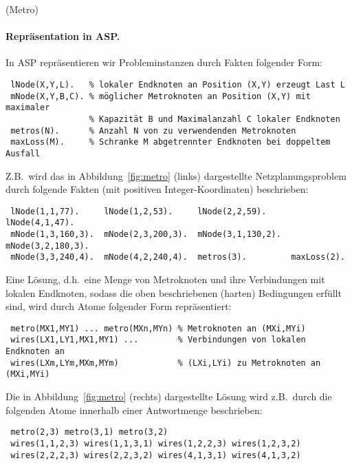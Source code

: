 \documentclass[a4paper,12pt,ngerman]{article}
\begin{document}
\begin{PraktikumsAufgabe}{2}{(Metro)}
\paragraph{Repräsentation in ASP.}

In ASP repräsentieren wir Probleminstanzen durch Fakten folgender Form:
\vspace{-1mm}
\begin{verbatim}
 lNode(X,Y,L).   % lokaler Endknoten an Position (X,Y) erzeugt Last L
 mNode(X,Y,B,C). % möglicher Metroknoten an Position (X,Y) mit maximaler
                 % Kapazität B und Maximalanzahl C lokaler Endknoten
 metros(N).      % Anzahl N von zu verwendenden Metroknoten
 maxLoss(M).     % Schranke M abgetrennter Endknoten bei doppeltem Ausfall
\end{verbatim}

\noindent
Z.B.\ wird das in Abbildung~\ref{fig:metro} (links) dargestellte Netzplanungsproblem
durch folgende Fakten (mit positiven Integer-Koordinaten) beschrieben:
\vspace{-1mm}
\begin{verbatim}
 lNode(1,1,77).     lNode(1,2,53).     lNode(2,2,59).     lNode(4,1,47).
 mNode(1,3,160,3).  mNode(2,3,200,3).  mNode(3,1,130,2).  mNode(3,2,180,3).
 mNode(3,3,240,4).  mNode(4,2,240,4).  metros(3).         maxLoss(2).
\end{verbatim}

\noindent
Eine Lösung, d.h.\ eine Menge von Metroknoten und ihre Verbindungen
mit lokalen Endknoten, sodass die oben beschriebenen (harten) Bedingungen erf\"ullt sind,
wird durch Atome folgender Form repräsentiert:%
\vspace{-1mm}
\begin{verbatim}
 metro(MX1,MY1) ... metro(MXn,MYn) % Metroknoten an (MXi,MYi)
 wires(LX1,LY1,MX1,MY1) ...        % Verbindungen von lokalen Endknoten an
 wires(LXm,LYm,MXm,MYm)            % (LXi,LYi) zu Metroknoten an (MXi,MYi)
\end{verbatim}
Die in Abbildung~\ref{fig:metro} (rechts) dargestellte Lösung wird z.B.\
durch die folgenden Atome innerhalb einer Antwortmenge beschrieben:
\vspace{-1mm}
\begin{verbatim}
 metro(2,3) metro(3,1) metro(3,2)
 wires(1,1,2,3) wires(1,1,3,1) wires(1,2,2,3) wires(1,2,3,2)
 wires(2,2,2,3) wires(2,2,3,2) wires(4,1,3,1) wires(4,1,3,2)
\end{verbatim}



\end{PraktikumsAufgabe}
\end{document}

